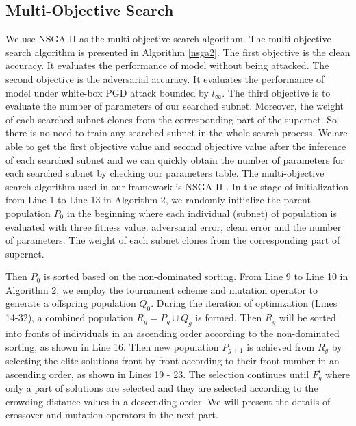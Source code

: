 \documentclass[journal]{IEEEtran}
\begin{document}
\subsection{\textbf{Multi-Objective Search}}
We use NSGA-II \cite{deb2002fast} as the multi-objective search algorithm. The multi-objective search algorithm is presented in Algorithm \ref{nsga2}. The first objective is the clean accuracy. It evaluates the performance of model without being attacked. The second objective is the adversarial accuracy. It evaluates the performance of model under white-box PGD attack bounded by $l_{\infty}$. The third objective is to evaluate the number of parameters of our searched
subnet. Moreover, the weight of each searched subnet clones from the corresponding part of the supernet. So there is no need to train any searched subnet in the whole search process. We are able to get the first objective value and second objective value after the inference of each searched subnet and we can quickly obtain the number of parameters for each searched subnet by checking our parameters table. The multi-objective search algorithm used in our framework is NSGA-II \cite{deb2002fast}. In the stage of initialization from Line 1 to Line 13 in Algorithm 2, we randomly initialize the parent population $P_{0}$ in the beginning where each individual (subnet) of population is evaluated with three fitness value: adversarial error, clean error and the number of parameters. The weight of each subnet clones from the corresponding part of supernet.


Then $P_{0}$ is sorted based on the non-dominated sorting. From Line 9 to Line 10 in Algorithm 2, we employ the tournament scheme and mutation operator to generate a offspring population $Q_{0}$. During the iteration of optimization (Lines 14-32), a combined population $R_{g} = P_{g} \cup Q_{g}$ is formed. Then $R_{g}$ will be sorted into fronts of individuals in an ascending order according to the non-dominated sorting, as shown in Line 16. Then new population $P_{g+1}$ is achieved from $R_{g}$ by selecting the elite solutions front by front according to their front number in an ascending order, as shown in Lines 19 - 23. The selection continues until $F_{g}^{i}$ where only a part of solutions are selected and they are selected according to the crowding distance values in a descending order. We will present the details of crossover and mutation operators in the next part.
\end{document}
